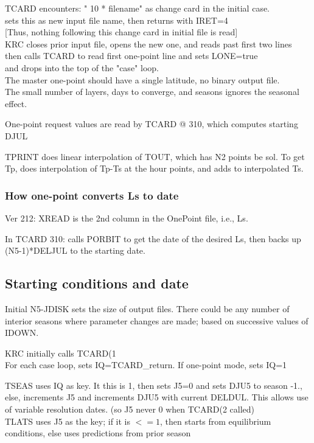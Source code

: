 \documentclass{article}
\newcommand{\qi}{\\ \hspace*{2.em}}      %
\begin{document}
TCARD encounters: " 10 * filename" as change card in the initial case.
\qi   sets this as new input file name, then returns with IRET=4 
\qi  [Thus, nothing following this change card in initial file is read] \\
KRC closes prior input file, opens the new one, and reads past first two lines 
\qi     then calls TCARD to read first one-point line and sets LONE=true
\qi     and drops into the top of the "case" loop. \\ 
The master one-point should have a single latitude, no binary output file. \\
The small number of layers, days to converge, and seasons ignores the seasonal 
effect.

One-point request values are read by TCARD @ 310, which computes starting DJUL

TPRINT does linear interpolation of TOUT, which has N2 points be sol. To get Tp,
does interpolation of Tp-Ts at the hour points, and adds to interpolated Ts.
 \subsubsection{How one-point converts Ls to date}
 Ver 212: 
XREAD is the 2nd column in the OnePoint file, i.e., Ls. 

In TCARD 310: calls PORBIT to get the date of the desired Ls, then backs up
(N5-1)*DELJUL to the starting date.

\subsection{Starting conditions and date}%

Initial N5-JDISK sets the size of output files. There could be any number of
interior seasons where parameter changes are made; based on successive values of
IDOWN.

KRC initially calls TCARD(1  \\
For each case loop, sets IQ=TCARD\_return. If one-point mode, sets IQ=1

TSEAS uses IQ as key. It this is 1, then sets J5=0 and sets DJU5 to season -1.,
else, increments J5 and increments DJU5 with current DELDUL. This allows use of
variable resolution dates. (so J5 never 0 when TCARD(2 called) \\

TLATS uses J5 as the key; if it is $<= 1$, then starts from equilibrium
conditions, else uses predictions from prior season
\end{document}
